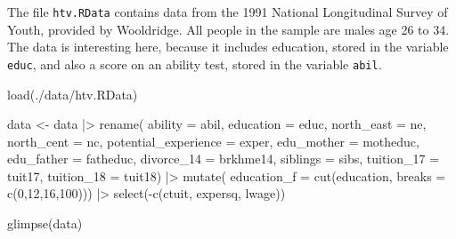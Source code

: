 \documentclass[
  letterpaper,
  DIV=11,
  numbers=noendperiod]{scrreprt}
\newenvironment{Shaded}{\begin{snugshade}}{\end{snugshade}}
\newcommand{\AttributeTok}[1]{\textcolor[rgb]{0.40,0.45,0.13}{#1}}
\newcommand{\DecValTok}[1]{\textcolor[rgb]{0.68,0.00,0.00}{#1}}
\newcommand{\FunctionTok}[1]{\textcolor[rgb]{0.28,0.35,0.67}{#1}}
\newcommand{\NormalTok}[1]{\textcolor[rgb]{0.00,0.23,0.31}{#1}}
\newcommand{\OtherTok}[1]{\textcolor[rgb]{0.00,0.23,0.31}{#1}}
\newcommand{\SpecialCharTok}[1]{\textcolor[rgb]{0.37,0.37,0.37}{#1}}
\newcommand{\StringTok}[1]{\textcolor[rgb]{0.13,0.47,0.30}{#1}}
\begin{document}
The file \texttt{htv.RData} contains data from the 1991 National
Longitudinal Survey of Youth, provided by Wooldridge. All people in the
sample are males age 26 to 34. The data is interesting here, because it
includes education, stored in the variable \texttt{educ}, and also a
score on an ability test, stored in the variable \texttt{abil}.

\begin{Shaded}
\begin{Highlighting}[]
\FunctionTok{load}\NormalTok{(}\StringTok{\textquotesingle{}./data/htv.RData\textquotesingle{}}\NormalTok{)}

\NormalTok{data }\OtherTok{\textless{}{-}}\NormalTok{ data }\SpecialCharTok{|\textgreater{}}  
  \FunctionTok{rename}\NormalTok{(}
    \AttributeTok{ability    =}\NormalTok{ abil, }
    \AttributeTok{education  =}\NormalTok{ educ, }
    \AttributeTok{north\_east =}\NormalTok{ ne, }
    \AttributeTok{north\_cent =}\NormalTok{ nc, }
    \AttributeTok{potential\_experience =}\NormalTok{ exper, }
    \AttributeTok{edu\_mother =}\NormalTok{ motheduc, }
    \AttributeTok{edu\_father =}\NormalTok{ fatheduc, }
    \AttributeTok{divorce\_14 =}\NormalTok{ brkhme14, }
    \AttributeTok{siblings   =}\NormalTok{ sibs, }
    \AttributeTok{tuition\_17 =}\NormalTok{ tuit17, }
    \AttributeTok{tuition\_18 =}\NormalTok{ tuit18) }\SpecialCharTok{|\textgreater{}}  
  \FunctionTok{mutate}\NormalTok{(}
    \AttributeTok{education\_f =} \FunctionTok{cut}\NormalTok{(education, }\AttributeTok{breaks =} \FunctionTok{c}\NormalTok{(}\DecValTok{0}\NormalTok{,}\DecValTok{12}\NormalTok{,}\DecValTok{16}\NormalTok{,}\DecValTok{100}\NormalTok{))) }\SpecialCharTok{|\textgreater{}} 
  \FunctionTok{select}\NormalTok{(}\SpecialCharTok{{-}}\FunctionTok{c}\NormalTok{(ctuit, expersq, lwage))}
  
\FunctionTok{glimpse}\NormalTok{(data)}
\end{Highlighting}
\end{Shaded}
\end{document}
